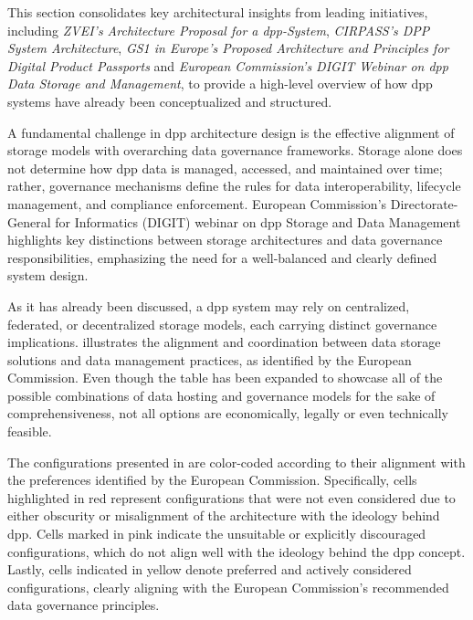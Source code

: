This section consolidates key architectural insights from leading initiatives, including \textit{ZVEI’s Architecture Proposal for a \ac{dpp}-System}, \textit{CIRPASS’s DPP System Architecture}, \textit{GS1 in Europe’s Proposed Architecture and Principles for Digital Product Passports} and \textit{European Commission’s DIGIT Webinar on \ac{dpp} Data Storage and Management}, to provide a high-level overview of how \ac{dpp} systems have already been conceptualized and structured.

A fundamental challenge in \ac{dpp} architecture design is the effective alignment of storage models with overarching data governance frameworks. Storage alone does not determine how \ac{dpp} data is managed, accessed, and maintained over time; rather, governance mechanisms define the rules for data interoperability, lifecycle management, and compliance enforcement. European Commission’s Directorate-General for Informatics (DIGIT) webinar on \ac{dpp} Storage and Data Management highlights key distinctions between storage architectures and data governance responsibilities, emphasizing the need for a well-balanced and clearly defined system design. \autocite{Frade.2023}

As it has already been discussed, a \ac{dpp} system may rely on centralized, federated, or decentralized storage models, each carrying distinct governance implications.  illustrates the alignment and coordination between data storage solutions and data management practices, as identified by the European Commission. Even though the table has been expanded to showcase all of the possible combinations of data hosting and governance models for the sake of comprehensiveness, not all options are economically, legally or even technically feasible. \autocite{Frade.2023}

The configurations presented in  are color-coded according to their alignment with the preferences identified by the European Commission. Specifically, cells highlighted in red represent configurations that were not even considered due to either obscurity or misalignment of the architecture with the ideology behind \ac{dpp}. Cells marked in pink indicate the unsuitable or explicitly discouraged configurations, which do not align well with the ideology behind the \ac{dpp} concept. Lastly, cells indicated in yellow denote preferred and actively considered configurations, clearly aligning with the European Commission’s recommended data governance principles. \autocite{Frade.2023}

